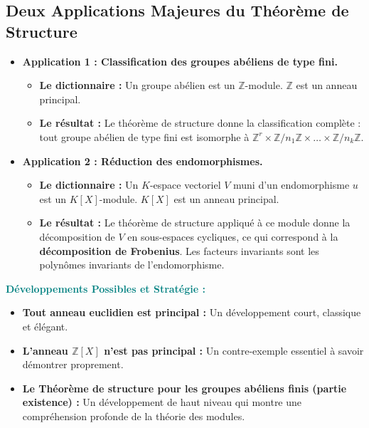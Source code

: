 \documentclass[12pt, a4paper, parskip=full]{report}
\theoremstyle{agregstyle}
\newenvironment{developpements}
  {\par\medskip\noindent\begin{oframed}\noindent\textbf{\textcolor{teal}{Développements Possibles et Stratégie :}}}
  {\end{oframed}\par\medskip}
\begin{document}
\subsection{Deux Applications Majeures du Théorème de Structure}
\begin{itemize}
    \item \textbf{Application 1 : Classification des groupes abéliens de type fini.}
        \begin{itemize}
            \item \textbf{Le dictionnaire :} Un groupe abélien est un $\mathbb{Z}$-module. $\mathbb{Z}$ est un anneau principal.
            \item \textbf{Le résultat :} Le théorème de structure donne la classification complète : tout groupe abélien de type fini est isomorphe à $\mathbb{Z}^r \times \mathbb{Z}/n_1\mathbb{Z} \times \dots \times \mathbb{Z}/n_k\mathbb{Z}$.
        \end{itemize}
    \item \textbf{Application 2 : Réduction des endomorphismes.}
        \begin{itemize}
            \item \textbf{Le dictionnaire :} Un $K$-espace vectoriel $V$ muni d'un endomorphisme $u$ est un $K[X]$-module. $K[X]$ est un anneau principal.
            \item \textbf{Le résultat :} Le théorème de structure appliqué à ce module donne la décomposition de $V$ en sous-espaces cycliques, ce qui correspond à la \textbf{décomposition de Frobenius}. Les facteurs invariants sont les polynômes invariants de l'endomorphisme.
        \end{itemize}
\end{itemize}

\begin{developpements}
    \begin{itemize}
        \item \textbf{Tout anneau euclidien est principal :} Un développement court, classique et élégant.
        \item \textbf{L'anneau $\mathbb{Z}[X]$ n'est pas principal :} Un contre-exemple essentiel à savoir démontrer proprement.
        \item \textbf{Le Théorème de structure pour les groupes abéliens finis (partie existence) :} Un développement de haut niveau qui montre une compréhension profonde de la théorie des modules.
    \end{itemize}
\end{developpements}
\end{document}
